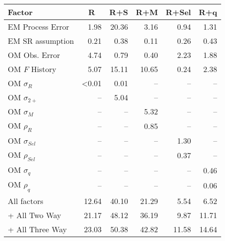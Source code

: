 \begin{center}
\begin{tabular}{lrrrrr}
\hline\hline
\multicolumn{1}{l}{Factor}&\multicolumn{1}{c}{R}&\multicolumn{1}{c}{R+S}&\multicolumn{1}{c}{R+M}&\multicolumn{1}{c}{R+Sel}&\multicolumn{1}{c}{R+q}\tabularnewline
\hline
EM Process Error& 1.98&20.36& 3.16& 0.94& 1.31\tabularnewline
EM SR assumption& 0.21& 0.38& 0.11& 0.26& 0.43\tabularnewline
OM Obs. Error& 4.74& 0.79& 0.40& 2.23& 1.88\tabularnewline
OM $F$ History& 5.07&15.11&10.65& 0.24& 2.38\tabularnewline
OM $\sigma_R$&\textless  0.01& 0.01&--&--&--\tabularnewline
OM $\sigma_{2+}$ &--& 5.04&--&--&--\tabularnewline
OM $\sigma_M$&--&--& 5.32&--&--\tabularnewline
OM $\rho_R$&--&--& 0.85&--&--\tabularnewline
OM $\sigma_{Sel}$&--&--&--& 1.30&--\tabularnewline
OM $\rho_{Sel}$&--&--&--& 0.37&--\tabularnewline
OM $\sigma_q$&--&--&--&--& 0.46\tabularnewline
OM $\rho_q$&--&--&--&--& 0.06\tabularnewline
All factors&12.64&40.10&21.29& 5.54& 6.52\tabularnewline
+ All Two Way&21.17&48.12&36.19& 9.87&11.71\tabularnewline
+ All Three Way&23.03&50.38&42.82&11.58&14.64\tabularnewline
\hline
\end{tabular}\end{center}
